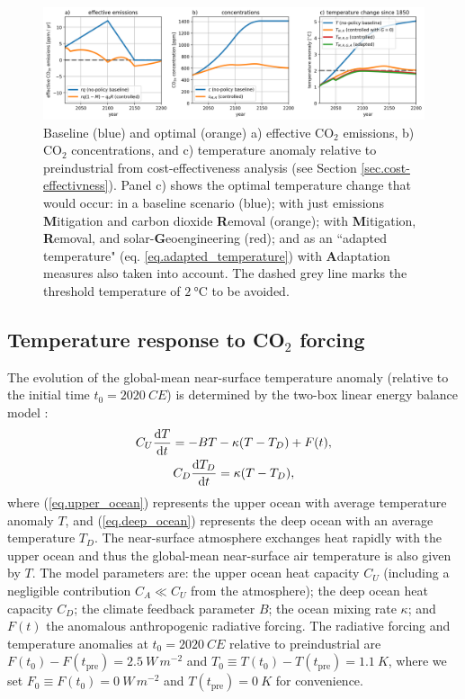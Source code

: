 \documentclass{article}
\begin{document}
\begin{figure}[htb!]
\noindent\includegraphics[width=1.0\textwidth]{figures/default-temp_carbon_and_temperatures.png}
\centering
\caption{Baseline (blue) and optimal (orange) a) effective CO$_{2}$ emissions, b) CO$_{2}$ concentrations, and c) temperature anomaly relative to preindustrial from cost-effectiveness analysis (see Section \ref{sec.cost-effectivness}). Panel c) shows the optimal temperature change that would occur: in a baseline scenario (blue); with just emissions \textbf{M}itigation and carbon dioxide \textbf{R}emoval (orange); with \textbf{M}itigation, \textbf{R}emoval, and solar-\textbf{G}eoengineering (red); and as an ``adapted temperature" (eq. \ref{eq.adapted_temperature}) with \textbf{A}daptation measures also taken into account. The dashed grey line marks the threshold temperature of $\SI{2}{\celsius}$ to be avoided.}
\label{fig.temp_and_carbon}
\end{figure}

\subsection{Temperature response to CO$_{2}$ forcing}
The evolution of the global-mean near-surface temperature anomaly (relative to the initial time $t_{0} = \SI{2020}{CE}$) is determined by the two-box linear energy balance model \citep[e.g][]{gregory_vertical_2000, held_probing_2010}:
\begin{gather}
    C_{U} \dv{T}{t} = -B T - \kappa( T - T_{D}) + F(t), \label{eq.upper_ocean}
    \\
    C_{D} \dv{T_{D}}{t} = \kappa (T - T_{D}),\label{eq.deep_ocean}
\end{gather}
where (\ref{eq.upper_ocean}) represents the upper ocean with average temperature anomaly $T$, and (\ref{eq.deep_ocean}) represents the deep ocean with an average temperature $T_{D}$. The near-surface atmosphere exchanges heat rapidly with the upper ocean and thus the global-mean near-surface air temperature is also given by $T$. The model parameters are: the upper ocean heat capacity $C_{U}$ (including a negligible contribution $C_{A} \ll C_{U}$ from the atmosphere); the deep ocean heat capacity $C_{D}$; the climate feedback parameter $B$; the ocean mixing rate $\kappa$; and $F(t)$ the anomalous anthropogenic radiative forcing. The radiative forcing and temperature anomalies at $t_{0} = \SI{2020}{CE}$ relative to preindustrial are $F(t_{0}) - F(t_{\text{pre}}) = \SI{2.5}{W\, m^{-2}}$ and $T_{0} \equiv T(t_{0}) - T(t_{\text{pre}}) = \SI{1.1}{K}$, where we set $F_{0} \equiv F(t_{0}) = \SI{0}{W\, m^{-2}}$ and $T(t_{\text{pre}}) = \SI{0}{K}$ for convenience.
\end{document}
